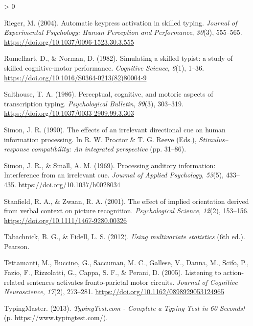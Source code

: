 \documentclass[
  english,
  man]{apa7}
\newlength{\cslhangindent}
\newenvironment{CSLReferences}[2] %
 {%
  \setlength{\parindent}{0pt}
  \ifodd #1 \everypar{\setlength{\hangindent}{\cslhangindent}}\ignorespaces\fi
  \ifnum #2 > 0
  \setlength{\parskip}{#2\baselineskip}
  \fi
 }%
 {}
\begin{document}
\begin{CSLReferences}{1}{0}
\leavevmode\hypertarget{ref-Rieger2004}{}%
Rieger, M. (2004). {Automatic keypress activation in skilled typing}. \emph{Journal of Experimental Psychology: Human Perception and Performance}, \emph{30}(3), 555--565. \url{https://doi.org/10.1037/0096-1523.30.3.555}

\leavevmode\hypertarget{ref-Rumelhart1982}{}%
Rumelhart, D., \& Norman, D. (1982). {Simulating a skilled typist: a study of skilled cognitive-motor performance}. \emph{Cognitive Science}, \emph{6}(1), 1--36. \url{https://doi.org/10.1016/S0364-0213(82)80004-9}

\leavevmode\hypertarget{ref-Salthouse1986}{}%
Salthouse, T. A. (1986). {Perceptual, cognitive, and motoric aspects of transcription typing}. \emph{Psychological Bulletin}, \emph{99}(3), 303--319. \url{https://doi.org/10.1037/0033-2909.99.3.303}

\leavevmode\hypertarget{ref-Simon1990}{}%
Simon, J. R. (1990). {The effects of an irrelevant directional cue on human information processing}. In R. W. Proctor \& T. G. Reeve (Eds.), \emph{Stimulus--response compatibility: An integrated perspective} (pp. 31--86).

\leavevmode\hypertarget{ref-Simon1969}{}%
Simon, J. R., \& Small, A. M. (1969). {Processing auditory information: Interference from an irrelevant cue}. \emph{Journal of Applied Psychology}, \emph{53}(5), 433--435. \url{https://doi.org/10.1037/h0028034}

\leavevmode\hypertarget{ref-Stanfield2001}{}%
Stanfield, R. A., \& Zwaan, R. A. (2001). {The effect of implied orientation derived from verbal context on picture recognition}. \emph{Psychological Science}, \emph{12}(2), 153--156. \url{https://doi.org/10.1111/1467-9280.00326}

\leavevmode\hypertarget{ref-Tabachnick2012}{}%
Tabachnick, B. G., \& Fidell, L. S. (2012). \emph{{Using multivariate statistics}} (6th ed.). Pearson.

\leavevmode\hypertarget{ref-Tettamanti2005}{}%
Tettamanti, M., Buccino, G., Saccuman, M. C., Gallese, V., Danna, M., Scifo, P., Fazio, F., Rizzolatti, G., Cappa, S. F., \& Perani, D. (2005). {Listening to action-related sentences activates fronto-parietal motor circuits}. \emph{Journal of Cognitive Neuroscience}, \emph{17}(2), 273--281. \url{https://doi.org/10.1162/0898929053124965}

\leavevmode\hypertarget{ref-Inc2013}{}%
TypingMaster. (2013). \emph{{TypingTest.com - Complete a Typing Test in 60 Seconds!}} (p. https://www.typingtest.com/).


\end{CSLReferences}
\end{document}
